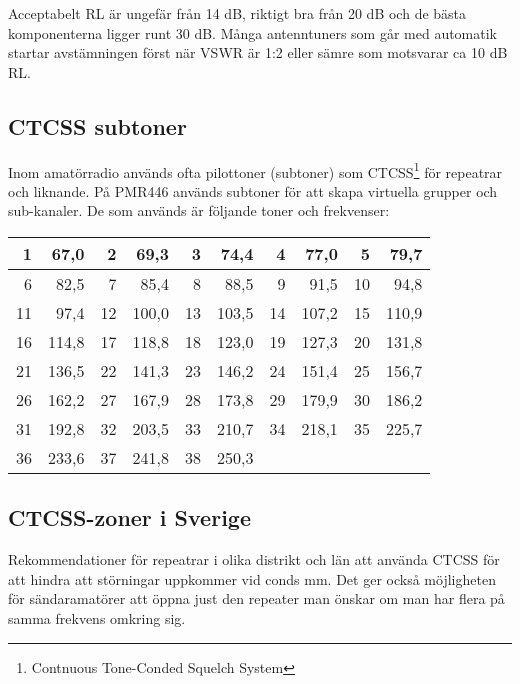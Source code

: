 Acceptabelt RL är ungefär från 14 dB, riktigt bra från 20 dB och de bästa komponenterna ligger runt 30 dB. Många antenntuners som går med automatik startar avstämningen först när VSWR är 1:2 eller sämre som motsvarar ca 10 dB RL.

\subsection{CTCSS subtoner}

Inom amatörradio används ofta pilottoner (subtoner) som CTCSS\footnote{Contnuous Tone-Conded Squelch System} för repeatrar och liknande. På PMR446 används subtoner för att skapa virtuella grupper och sub-kanaler. De som används är följande toner och frekvenser:

\begin{tabular}{rr|rr|rr|rr|rr}
	 1 &  67,0 &  2 &  69,3 &  3 &  74,4 &  4 &  77,0 &  5 &  79,7 \\ \hline
	 6 &  82,5 &  7 &  85,4 &  8 &  88,5 &  9 &  91,5 & 10 &  94,8 \\ \hline
	11 &  97,4 & 12 & 100,0 & 13 & 103,5 & 14 & 107,2 & 15 & 110,9 \\ \hline
	16 & 114,8 & 17 & 118,8 & 18 & 123,0 & 19 & 127,3 & 20 & 131,8 \\ \hline
	21 & 136,5 & 22 & 141,3 & 23 & 146,2 & 24 & 151,4 & 25 & 156,7 \\ \hline
	26 & 162,2 & 27 & 167,9 & 28 & 173,8 & 29 & 179,9 & 30 & 186,2 \\ \hline
	31 & 192,8 & 32 & 203,5 & 33 & 210,7 & 34 & 218,1 & 35 & 225,7 \\ \hline
	36 & 233,6 & 37 & 241,8 & 38 & 250,3 &    &       &    &
\end{tabular}

\subsection{CTCSS-zoner i Sverige}

Rekommendationer för repeatrar i olika distrikt och län att använda CTCSS för att hindra att störningar uppkommer vid conds mm. Det ger också möjligheten för sändaramatörer att öppna just den repeater man önskar om man har flera på samma frekvens omkring sig.


